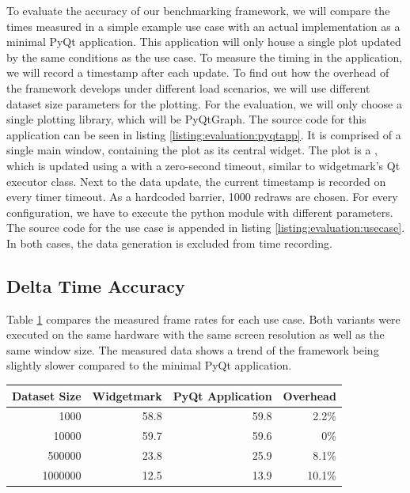 To evaluate the accuracy of our benchmarking framework, we will compare the
times measured in a simple example use case with an actual implementation as a
minimal PyQt application. This application will only house a single plot updated
by the same conditions as the use case. To measure the timing in the
application, we will record a timestamp after each update. To find out how the
overhead of the framework develops under different load scenarios, we will use
different dataset size parameters for the plotting. For the evaluation, we will
only choose a single plotting library, which will be PyQtGraph. The source code
for this application can be seen in listing \ref{listing:evaluation:pyqtapp}. It
is comprised of a single main window, containing the plot as its central widget.
The plot is a , which is updated
using a  with a zero-second timeout, similar to
widgetmark's Qt executor class. Next to the data update, the current timestamp
is recorded on every timer timeout. As a hardcoded barrier, 1000 redraws are
chosen. For every configuration, we have to execute the python module with
different parameters. The source code for the use case is appended in listing
\ref{listing:evaluation:usecase}. In both cases, the data generation is
excluded from time recording.

\subsection{Delta Time Accuracy}

Table \ref{tab:evaluation} compares the measured frame rates for each use case.
Both variants were executed on the same hardware with the same screen resolution
as well as the same window size. The measured data shows a trend of the
framework being slightly slower compared to the minimal PyQt application.

\begin{table}[h]
\begin{center}

\label{tab:evaluation}

\begin{tabular}{rrrr}

\hline
Dataset Size & Widgetmark & PyQt Application & Overhead \\
\hline
1000         & 58.8       & 59.8             & 2.2\%    \\
10000        & 59.7       & 59.6             & 0\%      \\
500000       & 23.8       & 25.9             & 8.1\%    \\
1000000      & 12.5       & 13.9             & 10.1\%   \\
\hline

\end{tabular}
\end{center}
\end{table}

